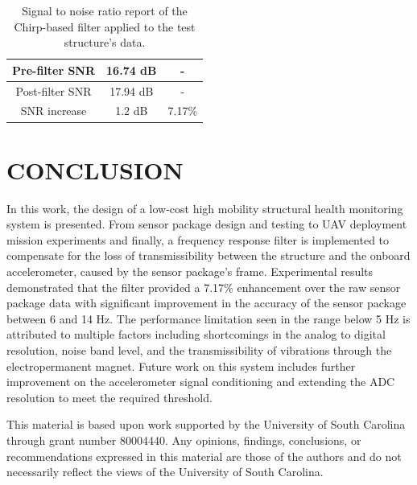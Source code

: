 \documentclass[]{spie}  %
\begin{document}
	\begin{table}[H]
	\caption{Signal to noise ratio report of the Chirp-based filter applied to the test structure’s data.} 
	\label{tab:SNR Report}
	\begin{center}       
		\begin{tabular}{|c|c|c|} 
			\hline
			\rule[-1ex]{0pt}{3.5ex}  Pre-filter SNR & 16.74 dB & - \\
			\hline
			\rule[-1ex]{0pt}{3.5ex}  Post-filter SNR & 17.94 dB & - \\
			\hline
			\rule[-1ex]{0pt}{3.5ex}  SNR increase & 1.2 dB & 7.17\% \\
			\hline
		\end{tabular}
	\end{center}
	\end{table}
	
	\section{CONCLUSION}
	In this work, the design of a low-cost high mobility structural health monitoring system is presented. From sensor package design and testing to UAV deployment mission experiments and finally, a frequency response filter is implemented to compensate for the loss of transmissibility between the structure and the onboard accelerometer, caused by the sensor package's frame. Experimental results demonstrated that the filter provided a 7.17\% enhancement over the raw sensor package data with significant improvement in the accuracy of the sensor package between 6 and 14 Hz. The performance limitation seen in the range below 5 Hz is attributed to multiple factors including shortcomings in the analog to digital resolution, noise band level, and the transmissibility of vibrations through the electropermanent magnet. Future work on this system includes further improvement on the accelerometer signal conditioning and extending the ADC resolution to meet the required threshold.  
	
	\acknowledgments %
	
	This material is based upon work supported by the University of South Carolina through grant number 80004440. Any opinions, findings, conclusions, or recommendations expressed in this material are those of the authors and do not necessarily reflect the views of the University of South Carolina.


	
\end{document}
